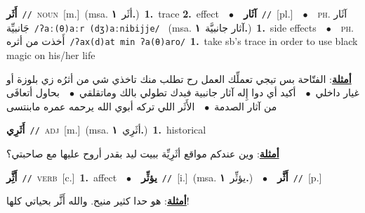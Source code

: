 \documentclass[10pt,a4paper,twoside]{article} %
\begin{document}
\begin{multicols}{2}
{{{{\setlength\topsep{0pt}\textbf{\foreignlanguage{arabic}{أَثَر}}\ {\color{gray}\texttt{//}\color{black}}\ \textsc{noun}\ [m.]\ \color{gray}(msa. \foreignlanguage{arabic}{أثَر}~\foreignlanguage{arabic}{\textbf{١.}})\color{black}\ \textbf{1.}~trace  \textbf{2.}~effect\ \ $\bullet$\ \ \setlength\topsep{0pt}\textbf{\foreignlanguage{arabic}{آثَار}}\ {\color{gray}\texttt{//}\color{black}}\ [pl.]\ \ $\bullet$\ \ \textsc{ph.} \color{gray} \foreignlanguage{arabic}{آثَار جَانبيِّة}\color{black}\ {\color{gray}\texttt{/{\sffamily ʔaː(θ)aːr (dʒ)aːnibijje}/}\color{black}}\ \color{gray} (msa. \foreignlanguage{arabic}{آثار جانبيَّة}~\foreignlanguage{arabic}{\textbf{١.}})\color{black}\ \textbf{1.}~side effects\ \ $\bullet$\ \ \textsc{ph.} \color{gray} \foreignlanguage{arabic}{أَخذت من أثره}\color{black}\ {\color{gray}\texttt{/{\sffamily ʔax(d)at min ʔa(θ)aro}/}\color{black}}\ \textbf{1.}~take sb's trace in order to use black magic on his/her life\  \begin{flushright}\color{gray}\foreignlanguage{arabic}{\textbf{\underline{\foreignlanguage{arabic}{أمثلة}}}: الفتّاحة بس تيجي تعملِّك العمل رح تطلب منك تاخذي شي من أثرُه زي بلوزة أو غيار داخلي\ $\bullet$\ \  أكيد أي دوا إِله آثار جانبية فبدك تطولي بالك وماتقلقي\ $\bullet$\ \  بحاول أتعافَى من آثار الصدمة\ $\bullet$\ \  الأَثَر اللي تركه أبوي الله يرحمه عمره مابنتسى}\end{flushright}\color{black}} \vspace{2mm}

{\setlength\topsep{0pt}\textbf{\foreignlanguage{arabic}{أَثَرِي}}\ {\color{gray}\texttt{//}\color{black}}\ \textsc{adj}\ [m.]\ \color{gray}(msa. \foreignlanguage{arabic}{أثَرِي}~\foreignlanguage{arabic}{\textbf{١.}})\color{black}\ \textbf{1.}~historical\  \begin{flushright}\color{gray}\foreignlanguage{arabic}{\textbf{\underline{\foreignlanguage{arabic}{أمثلة}}}: وين عندكم مواقع أثَرِيِّة ببيت ليد بقدر أروح عليها مع صاحبتي؟}\end{flushright}\color{black}} \vspace{2mm}

{\setlength\topsep{0pt}\textbf{\foreignlanguage{arabic}{أَثَِّر}}\ {\color{gray}\texttt{//}\color{black}}\ \textsc{verb}\ [c.]\ \textbf{1.}~affect\ \ $\bullet$\ \ \setlength\topsep{0pt}\textbf{\foreignlanguage{arabic}{يؤثِّر}}\ {\color{gray}\texttt{//}\color{black}}\ [i.]\ \color{gray}(msa. \foreignlanguage{arabic}{يؤثِّر}~\foreignlanguage{arabic}{\textbf{١.}})\color{black}\ \ $\bullet$\ \ \setlength\topsep{0pt}\textbf{\foreignlanguage{arabic}{أَثَّر}}\ {\color{gray}\texttt{//}\color{black}}\ [p.]\  \begin{flushright}\color{gray}\foreignlanguage{arabic}{\textbf{\underline{\foreignlanguage{arabic}{أمثلة}}}: هو حدا كثير منيح. والله أَثَّر بحياتي كلها!}\end{flushright}\color{black}} \vspace{2mm}

}}}
\end{multicols}
\end{document}

